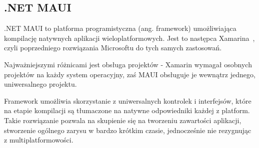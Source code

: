 \subsection{.NET MAUI}
.NET MAUI \cite{mauiDefinition} to platforma programistyczna (ang. framework) umożliwiająca
kompilację natywnych aplikacji wieloplatformowych. Jest to następca Xamarina~\cite{xamarin},
czyli poprzedniego rozwiązania Microsoftu do tych samych zastosowań.

Najważniejszymi różnicami jest obsługa projektów - Xamarin wymagał osobnych projektów na każdy system operacyjny, 
zaś MAUI obsługuje je wewnątrz jednego, uniwersalnego projektu.

Framework umożliwia skorzystanie z uniwersalnych kontrolek i interfejsów, 
które na etapie kompilacji są tłumaczone na natywne odpowiedniki każdej z platform. 
Takie rozwiązanie pozwala na skupienie się na tworzeniu zawartości aplikacji,
stworzenie ogólnego zarysu w bardzo krótkim czasie, jednocześnie nie rezygnując z multiplatformowości.